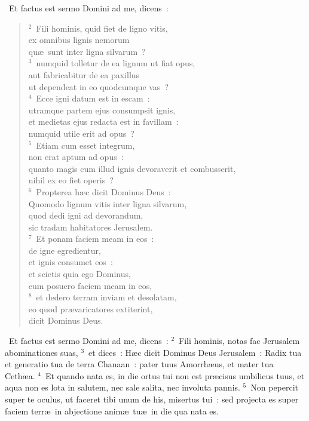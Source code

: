 ~Et factus est sermo Domini ad me, dicens~:
\begin{flushleft}\begin{verse}\vspace{6pt}${}^{2}$~Fili hominis, quid fiet de ligno vitis,\\ ex omnibus lignis nemorum\\ qu\ae\ sunt inter ligna silvarum~?\\
${}^{3}$~numquid tolletur de ea lignum ut fiat opus,\\ aut fabricabitur de ea paxillus\\ ut dependeat in eo quodcumque vas~?\\
${}^{4}$~Ecce igni datum est in escam~:\\ utramque partem ejus consumpsit ignis,\\ et medietas ejus redacta est in favillam~:\\ numquid utile erit ad opus~?\\
${}^{5}$~Etiam cum esset integrum,\\ non erat aptum ad opus~:\\ quanto magis cum illud ignis devoraverit et combusserit,\\ nihil ex eo fiet operis~?\\
${}^{6}$~Propterea h\ae c dicit Dominus Deus~:\\ Quomodo lignum vitis inter ligna silvarum,\\ quod dedi igni ad devorandum,\\ sic tradam habitatores Jerusalem.\\
${}^{7}$~Et ponam faciem meam in eos~:\\ de igne egredientur,\\ et ignis consumet eos~:\\ et scietis quia ego Dominus,\\ cum posuero faciem meam in eos,\\
${}^{8}$~et dedero terram inviam et desolatam,\\ eo quod pr\ae varicatores extiterint,\\ dicit Dominus Deus.\end{verse}\end{flushleft}


~Et factus est sermo Domini ad me, dicens~:
${}^{2}$~Fili hominis, notas fac Jerusalem abominationes suas,
${}^{3}$~et dices~: H\ae c dicit Dominus Deus Jerusalem~: Radix tua et generatio tua de terra Chanaan~: pater tuus Amorrh\ae us, et mater tua Ceth\ae a.
${}^{4}$~Et quando nata es, in die ortus tui non est pr\ae cisus umbilicus tuus, et aqua non es lota in salutem, nec sale salita, nec involuta pannis.
${}^{5}$~Non pepercit super te oculus, ut faceret tibi unum de his, misertus tui~: sed projecta es super faciem terr\ae\ in abjectione anim\ae\ tu\ae\ in die qua nata es.


